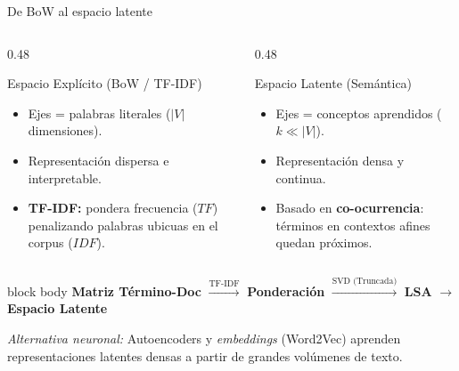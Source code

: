 \documentclass[aspectratio=169,10pt]{beamer}
\begin{document}
\begin{frame}[label={sec:orgdf4721e}]{De BoW al espacio latente}
\vspace{-0.7em}
\begin{columns}[T,onlytextwidth]
  \begin{column}{0.48\textwidth}
    \begin{block}{Espacio Explícito (BoW / TF-IDF)}
      \begin{itemize}\setlength{\itemsep}{0.12em}
        \item Ejes = palabras literales ($|V|$ dimensiones).
        \item Representación dispersa e interpretable.
        \item \textbf{TF-IDF:} pondera frecuencia ($TF$) penalizando palabras ubicuas en el corpus ($IDF$).
      \end{itemize}
    \end{block}
  \end{column}

  \begin{column}{0.48\textwidth}
    \begin{block}{Espacio Latente (Semántica)}
      \begin{itemize}\setlength{\itemsep}{0.12em}
        \item Ejes = conceptos aprendidos ($k \ll |V|$).
        \item Representación densa y continua.
        \item Basado en \textbf{co-ocurrencia}: términos en contextos afines quedan próximos.
      \end{itemize}
    \end{block}
  \end{column}
\end{columns}

\smallskip
\begin{center}
  \begin{beamercolorbox}[sep=0.35em,center,rounded=true]{block body}
    \small
    \textbf{Matriz Término-Doc}
    $\xrightarrow{\text{TF-IDF}}$ \textbf{Ponderación}
    $\xrightarrow{\text{SVD (Truncada)}}$ \textbf{LSA}
    $\longrightarrow$ \alert{\textbf{Espacio Latente}}
  \end{beamercolorbox}
\end{center}

\smallskip
\centering
\scriptsize
\textit{Alternativa neuronal:} Autoencoders y \textit{embeddings} (Word2Vec) aprenden representaciones latentes densas a partir de grandes volúmenes de texto.
\end{frame}
\end{document}
